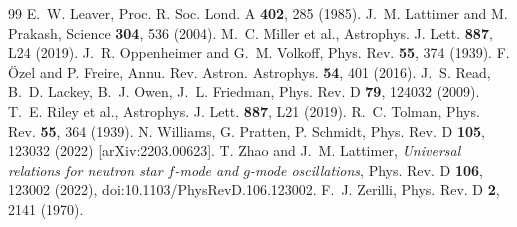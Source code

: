 \documentclass[11pt,a4paper]{article}
\begin{document}
\begin{thebibliography}{99}
 E.~W. Leaver, Proc. R. Soc. Lond. A \textbf{402}, 285 (1985).
 J.~M. Lattimer and M. Prakash, Science \textbf{304}, 536 (2004).
 M.~C. Miller et al., Astrophys. J. Lett. \textbf{887}, L24 (2019).
 J.~R. Oppenheimer and G.~M. Volkoff, Phys. Rev. \textbf{55}, 374 (1939).
 F. \"Ozel and P. Freire, Annu. Rev. Astron. Astrophys. \textbf{54}, 401 (2016).
 J.~S. Read, B.~D. Lackey, B.~J. Owen, J.~L. Friedman, Phys. Rev. D \textbf{79}, 124032 (2009).
 T.~E. Riley et al., Astrophys. J. Lett. \textbf{887}, L21 (2019).
 R.~C. Tolman, Phys. Rev. \textbf{55}, 364 (1939).
 N. Williams, G. Pratten, P. Schmidt, Phys. Rev. D \textbf{105}, 123032 (2022) [arXiv:2203.00623].
 T. Zhao and J.~M. Lattimer, \emph{Universal relations for neutron star $f$-mode and $g$-mode oscillations}, Phys. Rev. D \textbf{106}, 123002 (2022), doi:10.1103/PhysRevD.106.123002.
 F.~J. Zerilli, Phys. Rev. D \textbf{2}, 2141 (1970).
\end{thebibliography}
\end{document}
